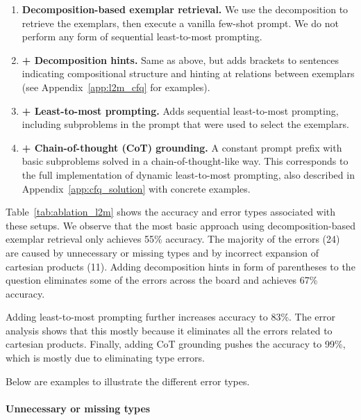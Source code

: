 \documentclass{article} \usepackage{iclr2022_conference,times}
\begin{document}
\begin{enumerate}
    \item \textbf{Decomposition-based exemplar retrieval.} We use the decomposition to retrieve the exemplars, then execute a vanilla few-shot prompt. We do not perform any form of sequential least-to-most prompting.
    
    \item \textbf{+ Decomposition hints.} Same as above, but adds brackets to sentences indicating compositional structure and hinting at relations between exemplars (see Appendix~\ref{app:l2m_cfq} for examples).
    
    \item \textbf{+ Least-to-most prompting.} Adds sequential least-to-most prompting, including subproblems in the prompt that were used to select the exemplars.
    
    \item \textbf{+ Chain-of-thought (CoT) grounding.} A constant prompt prefix with basic subproblems solved in a chain-of-thought-like way. This corresponds to the full implementation of dynamic least-to-most prompting, also described in Appendix~\ref{app:cfq_solution} with concrete examples.
\end{enumerate}

Table~\ref{tab:ablation_l2m} shows the accuracy and error types associated with these setups. We observe that the most basic approach using decomposition-based exemplar retrieval only achieves 55\% accuracy. The majority of the errors (24) are caused by unnecessary or missing types and by incorrect expansion of cartesian products (11). Adding decomposition hints in form of parentheses to the question eliminates some of the errors across the board and achieves 67\% accuracy.

Adding least-to-most prompting further increases accuracy to 83\%. The error analysis shows that this mostly because it eliminates all the errors related to cartesian products. Finally, adding CoT grounding pushes the accuracy to 99\%, which is mostly due to eliminating type errors.

Below are examples to illustrate the different error types.

\paragraph{Unnecessary or missing types}
\end{document}
